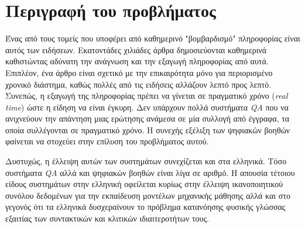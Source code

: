 \section{Περιγραφή του προβλήματος}
Ένας από τους τομείς που υποφέρει από καθημερινό "βομβαρδισμό" πληροφορίας είναι αυτός των ειδήσεων. Εκατοντάδες χιλιάδες άρθρα δημοσιεύονται καθημερινά καθιστώντας αδύνατη την ανάγνωση και την εξαγωγή πληροφορίας από αυτά. Επιπλέον, ένα άρθρο είναι σχετικό με την επικαιρότητα μόνο για περιορισμένο χρονικό διάστημα, καθώς πολλές από τις ειδήσεις αλλάζουν λεπτό προς λεπτό. Συνεπώς, η εξαγωγή της πληροφορίας πρέπει να γίνεται σε πραγματικό χρόνο (\emph{real time}) ώστε η είδηση να είναι έγκυρη. Δεν υπάρχουν πολλά συστήματα \emph{QA} που να ανιχνεύουν την απάντηση μιας ερώτησης ανάμεσα σε μία συλλογή από έγγραφα, τα οποία συλλέγονται σε πραγματικό χρόνο. Η συνεχής εξέλιξη των ψηφιακών βοηθών φαίνεται να στοχεύει στην επίλυση του προβλήματος αυτού.

Δυστυχώς, η έλλειψη αυτών των συστημάτων συνεχίζεται και στα ελληνικά. Τόσο συστήματα \emph{QA} αλλά και ψηφιακών βοηθών είναι λίγα σε αριθμό. Η απουσία τέτοιου είδους συστημάτων στην ελληνική οφείλεται κυρίως στην έλλειψη ικανοποιητικού συνόλου δεδομένων για την εκπαίδευση μοντέλων μηχανικής μάθησης αλλά και στο γεγονός ότι τα ελληνικά δυσχεραίνουν το πρόβλημα κατανόησης φυσικής γλώσσας εξαιτίας των συντακτικών και κλιτικών ιδιαιτεροτήτων τους.